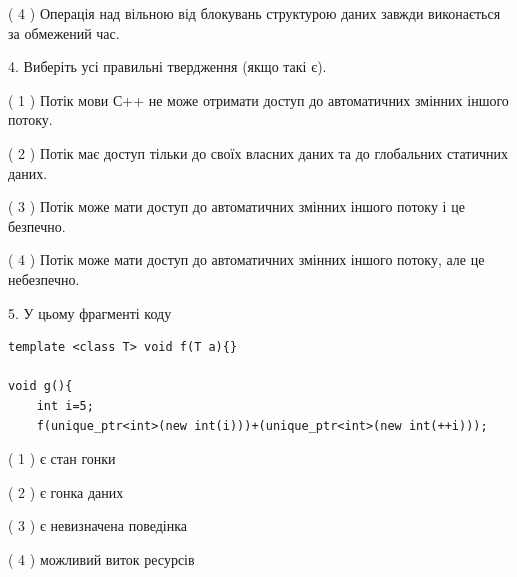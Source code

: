 \documentclass[12pt, ukrainian]{article}
\begin{document}
\begin {large}
{( 4 ) Операція над вільною від блокувань структурою даних завжди виконається за обмежений час.%


4. Виберіть усі правильні твердження (якщо такі є).\par
\vspace{2mm}

( 1 ) Потік мови С++ не може отримати доступ до автоматичних змінних іншого потоку.%

( 2 ) Потік має доступ тільки до своїх власних даних та до глобальних статичних даних.%

( 3 ) Потік може мати доступ до автоматичних змінних іншого потоку і це безпечно.%

( 4 ) Потік може мати доступ до автоматичних змінних іншого потоку, але це небезпечно.%


5. У цьому фрагменті коду
\begin{verbatim}
template <class T> void f(T a){}

void g(){
    int i=5;
    f(unique_ptr<int>(new int(i)))+(unique_ptr<int>(new int(++i)));
\end{verbatim}
( 1 ) є стан гонки%

( 2 ) є гонка даних%

( 3 ) є невизначена поведінка%

( 4 ) можливий виток ресурсів%
}
\end {large}
\end{document}
